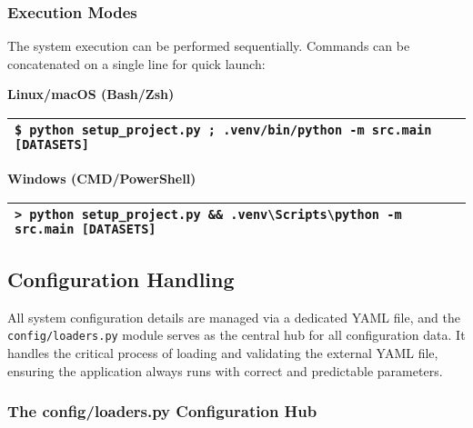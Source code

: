 \documentclass[12pt,a4paper]{article}
\begin{document}
\subsubsection{Execution Modes}

The system execution can be performed sequentially. Commands can be concatenated on a single line for quick launch:

\renewcommand{\arraystretch}{1.5}
\vspace{0.5em}

\noindent \textbf{Linux/macOS (Bash/Zsh)}
\begin{table}[h]
    \centering
    \label{tab:execution_linux_full}
    \begin{tabular}{|p{\textwidth}|} %
        \hline
        \texttt{\$ python setup\_project.py ; .venv/bin/python -m src.main [DATASETS]} \\
        \hline
    \end{tabular}
\end{table}

\noindent \textbf{Windows (CMD/PowerShell)}
\begin{table}[h]
    \centering
    \label{tab:execution_windows_simple}
    \begin{tabular}{|p{\textwidth}|} %
        \hline
        \texttt{> python setup\_project.py \&\& .venv\textbackslash Scripts\textbackslash python -m src.main [DATASETS]} \\
        \hline
    \end{tabular}
\end{table}
\renewcommand{\arraystretch}{1.0}

\newpage
\subsection{Configuration Handling}

All system configuration details are managed via a dedicated YAML file, and the \texttt{config/loaders.py} module serves as the central hub for all configuration data. It handles the critical process of loading and validating the external YAML file, ensuring the application always runs with correct and predictable parameters.

\subsubsection{The config/loaders.py Configuration Hub}
\end{document}
